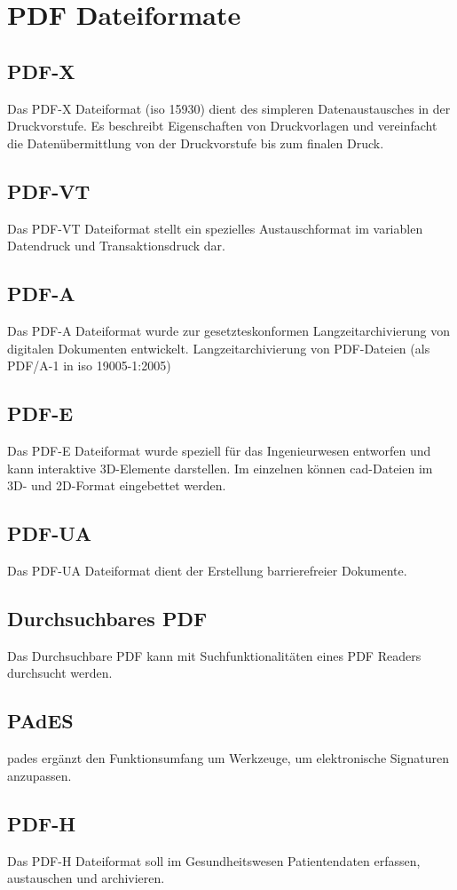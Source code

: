 \section{PDF Dateiformate}

\subsection{PDF-X}
Das PDF-X Dateiformat (\gls{iso} 15930) dient des simpleren Datenaustausches in der Druckvorstufe. Es beschreibt Eigenschaften von Druckvorlagen und vereinfacht die Datenübermittlung von der Druckvorstufe bis zum finalen Druck.

\subsection{PDF-VT}
Das PDF-VT Dateiformat stellt ein spezielles Austauschformat im variablen Datendruck und Transaktionsdruck dar.

\subsection{PDF-A}
Das PDF-A Dateiformat wurde zur gesetzteskonformen Langzeitarchivierung von digitalen Dokumenten entwickelt.
Langzeitarchivierung von PDF-Dateien (als PDF/A-1 in \gls{iso} 19005-1:2005) 

\subsection{PDF-E}
Das PDF-E Dateiformat wurde speziell für das Ingenieurwesen entworfen und kann interaktive 3D-Elemente darstellen. Im einzelnen können \gls{cad}-Dateien im 3D- und 2D-Format eingebettet werden.

\subsection{PDF-UA}
Das PDF-UA Dateiformat dient der Erstellung barrierefreier Dokumente.

\subsection{Durchsuchbares PDF}
Das Durchsuchbare PDF kann mit Suchfunktionalitäten eines PDF Readers durchsucht werden.

\subsection{PAdES}
\gls{pades} ergänzt den Funktionsumfang um Werkzeuge, um elektronische Signaturen anzupassen.

\subsection{PDF-H}
Das PDF-H Dateiformat soll im Gesundheitswesen Patientendaten erfassen, austauschen und archivieren.
